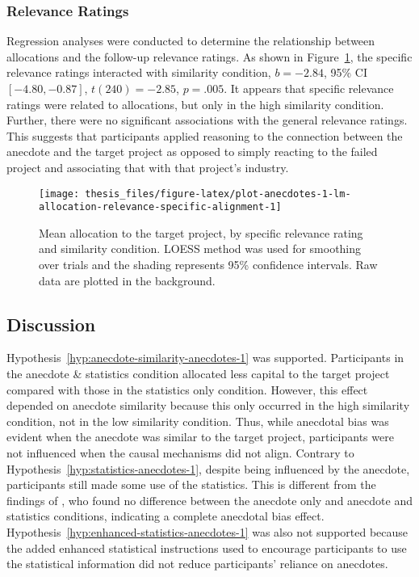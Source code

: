 \documentclass[a4paper, nobind]{templates/ociamthesis}
\theoremstyle{definition}
\theoremstyle{definition}
\theoremstyle{definition}
\theoremstyle{definition}
\theoremstyle{remark}
\begin{document}
\subsubsection{Relevance Ratings}

Regression analyses were conducted to determine the relationship between
allocations and the follow-up relevance ratings. As shown in
Figure~\ref{fig:plot-anecdotes-1-lm-allocation-relevance-specific-alignment},
the specific relevance ratings interacted with similarity condition,
\(b = -2.84\), 95\% CI \([-4.80, -0.87]\), \(t(240) = -2.85\), \(p = .005\). It appears
that specific relevance ratings were related to allocations, but only in the
high similarity condition. Further, there were no significant associations with
the general relevance ratings. This suggests that participants applied reasoning
to the connection between the anecdote and the target project as opposed to
simply reacting to the failed project and associating that with that project's
industry.



\begin{figure}
\texttt{[image: thesis\_files/figure-latex/plot-anecdotes-1-lm-allocation-relevance-specific-alignment-1]} \caption{Mean allocation to the target project, by specific relevance rating and similarity condition. LOESS method was used for smoothing over trials and the shading represents 95\% confidence intervals. Raw data are plotted in the background.}\label{fig:plot-anecdotes-1-lm-allocation-relevance-specific-alignment}
\end{figure}

\subsection{Discussion}

Hypothesis~\ref{hyp:anecdote-similarity-anecdotes-1} was supported.
Participants in the anecdote \& statistics condition allocated less capital to
the target project compared with those in the statistics only condition.
However, this effect depended on anecdote similarity because this only occurred
in the high similarity condition, not in the low similarity condition. Thus,
while anecdotal bias was evident when the anecdote was similar to the target
project, participants were not influenced when the causal mechanisms did not
align. Contrary to Hypothesis~\ref{hyp:statistics-anecdotes-1}, despite being
influenced by the anecdote, participants still made some use of the statistics.
This is different from the findings of \textcite{wainberg2013}, who found no difference
between the anecdote only and anecdote and statistics conditions, indicating a
complete anecdotal bias effect.
Hypothesis~\ref{hyp:enhanced-statistics-anecdotes-1} was also not supported
because the added enhanced statistical instructions used to encourage
participants to use the statistical information did not reduce participants'
reliance on anecdotes.
\end{document}
